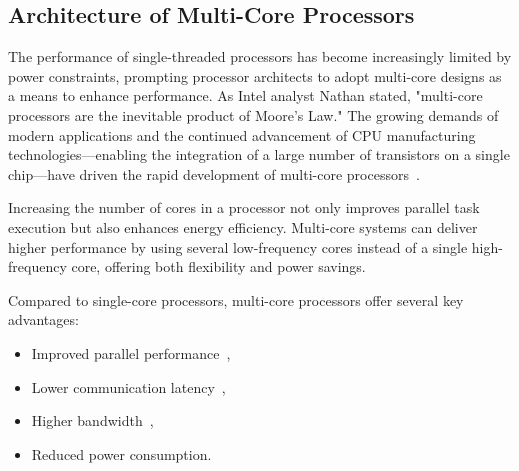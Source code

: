 \documentclass[conference]{IEEEtran}
\begin{document}







\subsection{Architecture of Multi-Core Processors}
\label{subsec: architecture of multi-core processors}

The performance of single-threaded processors has become increasingly limited by power constraints, prompting processor architects to adopt multi-core designs as a means to enhance performance. As Intel analyst Nathan stated, "multi-core processors are the inevitable product of Moore's Law." The growing demands of modern applications and the continued advancement of CPU manufacturing technologies—enabling the integration of a large number of transistors on a single chip—have driven the rapid development of multi-core processors~\cite{6234619}.


Increasing the number of cores in a processor not only improves parallel task execution but also enhances energy efficiency. Multi-core systems can deliver higher performance by using several low-frequency cores instead of a single high-frequency core, offering both flexibility and power savings.

Compared to single-core processors, multi-core processors offer several key advantages:
\begin{itemize}
    \item Improved parallel performance~\cite{h2000},
    \item Lower communication latency~\cite{lx2015},
    \item Higher bandwidth~\cite{997877},
    \item Reduced power consumption.
\end{itemize}
\end{document}
